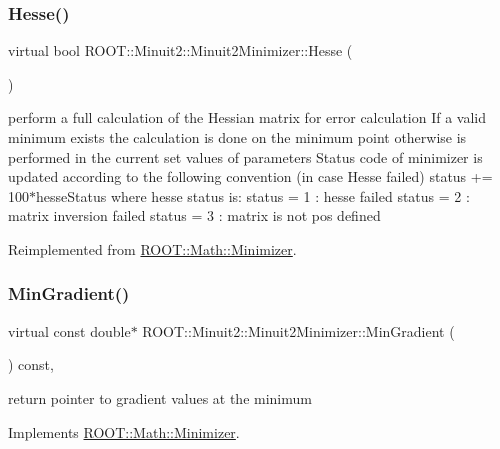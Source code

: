 \subsubsection{\texorpdfstring{Hesse()}{Hesse()}\hspace{0.1cm}{\footnotesize\ttfamily [3/3]}}
{\footnotesize\ttfamily virtual bool R\+O\+O\+T\+::\+Minuit2\+::\+Minuit2\+Minimizer\+::\+Hesse (\begin{DoxyParamCaption}{ }\end{DoxyParamCaption})\hspace{0.3cm}{\ttfamily [virtual]}}

perform a full calculation of the Hessian matrix for error calculation If a valid minimum exists the calculation is done on the minimum point otherwise is performed in the current set values of parameters Status code of minimizer is updated according to the following convention (in case Hesse failed) status += 100$\ast$hesse\+Status where hesse status is\+: status = 1 \+: hesse failed status = 2 \+: matrix inversion failed status = 3 \+: matrix is not pos defined 

Reimplemented from \mbox{\hyperlink{classROOT_1_1Math_1_1Minimizer_ae903e5936bef4ea7fac3301f9cdc50be}{R\+O\+O\+T\+::\+Math\+::\+Minimizer}}.

\mbox{\label{classROOT_1_1Minuit2_1_1Minuit2Minimizer_a52c6b3a13108b64366b1acd43f7e2b9a}} 
\subsubsection{\texorpdfstring{MinGradient()}{MinGradient()}\hspace{0.1cm}{\footnotesize\ttfamily [1/3]}}
{\footnotesize\ttfamily virtual const double$\ast$ R\+O\+O\+T\+::\+Minuit2\+::\+Minuit2\+Minimizer\+::\+Min\+Gradient (\begin{DoxyParamCaption}{ }\end{DoxyParamCaption}) const\hspace{0.3cm}{\ttfamily [inline]}, {\ttfamily [virtual]}}



return pointer to gradient values at the minimum 



Implements \mbox{\hyperlink{classROOT_1_1Math_1_1Minimizer_a861036d38a21d9a60d44e068397307af}{R\+O\+O\+T\+::\+Math\+::\+Minimizer}}.

